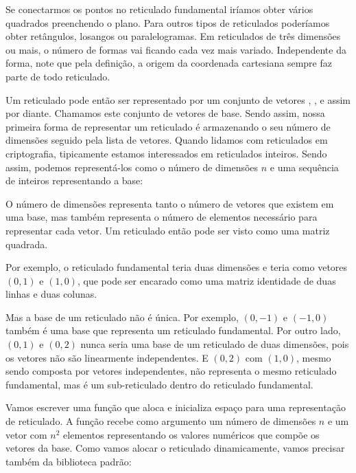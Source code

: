 
Se conectarmos os pontos no reticulado fundamental iríamos obter
vários quadrados preenchendo o plano. Para outros tipos de reticulados
poderíamos obter retângulos, losangos ou paralelogramas. Em
reticulados de três dimensões ou mais, o número de formas vai ficando
cada vez mais variado. Independente da forma, note que pela definição,
a origem da coordenada cartesiana sempre faz parte de todo reticulado.

Um reticulado pode então ser representado por um conjunto de vetores
, , e assim por diante. Chamamos este conjunto de
vetores de base. Sendo assim, nossa primeira forma de representar um
reticulado é armazenando o seu número de dimensões seguido pela lista
de vetores. Quando lidamos com reticulados em criptografia,
tipicamente estamos interessados em reticulados inteiros. Sendo assim,
podemos representá-los como o número de dimensões $n$ e uma sequência
de inteiros representando a base:


O número de dimensões representa tanto o número de vetores que existem
em uma base, mas também representa o número de elementos necessário
para representar cada vetor. Um reticulado então pode ser visto como
uma matriz quadrada.

Por exemplo, o reticulado fundamental teria duas dimensões e teria
como vetores $(0, 1)$ e $(1, 0)$, que pode ser encarado como uma
matriz identidade de duas linhas e duas colunas.

Mas a base de um reticulado não é única. Por exemplo, $(0, -1)$ e
$(-1, 0)$ também é uma base que representa um reticulado
fundamental. Por outro lado, $(0, 1)$ e $(0,2)$ nunca seria uma base
de um reticulado de duas dimensões, pois os vetores não são
linearmente independentes. E $(0, 2)$ com $(1, 0)$, mesmo sendo
composta por vetores independentes, não representa o mesmo reticulado
fundamental, mas é um sub-reticulado dentro do reticulado
fundamental.

Vamos escrever uma função que aloca e inicializa espaço para uma
representação de reticulado. A função recebe como argumento um número
de dimensões $n$ e um vetor com $n^2$ elementos representando os
valores numéricos que compõe os vetores da base. Como vamos alocar o
reticulado dinamicamente, vamos precisar também da biblioteca padrão:


